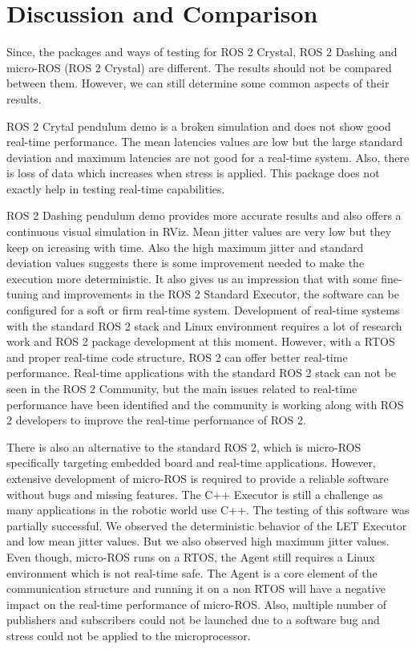 \documentclass[%
xelatex,
	oneside,		%
	12pt,			%
	parskip=half,	%
	abstracton,
	chapterprefix=true%
    appendixprefix=true]
{scrbook}
\begin{document}
		\section{Discussion and Comparison}
		\vspace*{0.25cm}
	Since, the packages and ways of testing for ROS 2 Crystal, ROS 2 Dashing and micro-ROS (ROS 2 Crystal) are different. The results should not be compared between them. However, we can still determine some common aspects of their results.
	
	ROS 2 Crytal pendulum demo is a broken simulation and does not show good real-time performance. The mean latencies values are low but the large standard deviation and maximum latencies are not good for a real-time system. Also, there is loss of data which increases when stress is applied. This package does not exactly help in testing real-time capabilities.
	\vspace*{0.25cm}
	
	ROS 2 Dashing pendulum demo provides more accurate results and also offers a continuous visual simulation in RViz. Mean jitter values are very low but they keep on icreasing with time. Also the high maximum jitter and standard deviation values suggests there is some improvement needed to make the execution more deterministic. It also gives us an impression that with some fine-tuning and improvements in the ROS 2 Standard Executor, the software can be configured for a soft or firm real-time system. Development of real-time systems with the standard ROS 2 stack and Linux environment requires a lot of research work and ROS 2 package development at this moment. However, with a RTOS and proper real-time code structure, ROS 2 can offer better real-time performance. Real-time applications with the standard ROS 2 stack can not be seen in the ROS 2 Community, but the main issues related to real-time performance have been identified and the community is working along with ROS 2 developers to improve the real-time performance of ROS 2.
	
	\vspace*{0.25cm}
	There is also an alternative to the standard ROS 2, which is micro-ROS specifically targeting embedded board and real-time applications. However, extensive development of micro-ROS is required to provide a reliable software without bugs and missing features. The C++ Executor is still a challenge as many applications in the robotic world use C++. The testing of this software was partially successful. We observed the deterministic behavior of the LET Executor and low mean jitter values. But we also observed high maximum jitter values. Even though, micro-ROS runs on a RTOS, the Agent still requires a Linux environment which is not real-time safe. The Agent is a core element of the communication structure and running it on a non RTOS will have a negative impact on the real-time performance of micro-ROS. Also, multiple number of publishers and subscribers could not be launched due to a software bug and stress could not be applied to the microprocessor.
\end{document}
